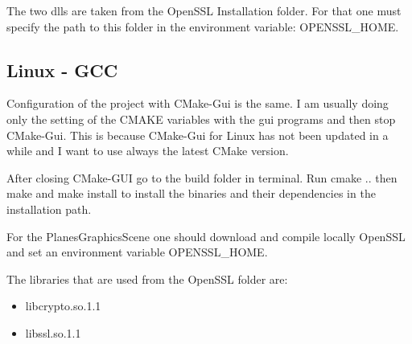 The two dlls are taken from the OpenSSL Installation folder. For that one must specify the path to this folder in the environment variable: OPENSSL\_HOME.

\subsection {Linux - GCC}

Configuration of the project with CMake-Gui is the same. I am usually doing only the setting of the CMAKE variables with the gui programs and then stop CMake-Gui. This is because CMake-Gui for Linux has not been updated in a while and I want to use always the latest CMake version. 

After closing CMake-GUI go to the build folder in terminal. Run cmake .. then make and make install to install the binaries and their dependencies in the installation path.

For the PlanesGraphicsScene one should download and compile locally OpenSSL and set an environment variable OPENSSL\_HOME.

The libraries that are used from the OpenSSL folder are:

\begin{itemize}
	\item libcrypto.so.1.1
	\item libssl.so.1.1
\end{itemize}